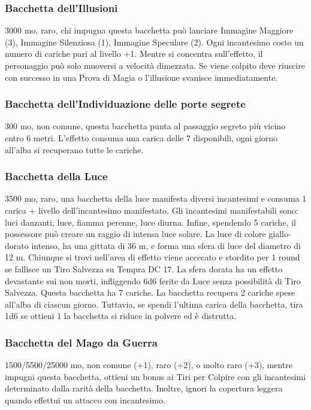 \begin{multicols}{2}
\subsubsection*{Bacchetta dell'Illusioni}
3000 mo, raro, chi impugna questa bacchetta può lanciare Immagine Maggiore (3), Immagine Silenziosa (1), Immagine Speculare (2). Ogni incantesimo costo un numero di cariche pari al livello +1. Mentre si concentra sull’effetto, il personaggio può solo muoversi a velocità dimezzata. Se viene colpito deve riuscire con successo in una Prova di Magia o l’illusione svanisce immediatamente.

\subsubsection*{Bacchetta dell'Individuazione delle porte segrete}
300 mo, non comune, questa bacchetta punta al passaggio segreto più vicino entro 6 metri. L'effetto consuma una carica delle 7 disponibili, ogni giorno all'alba si recuperano tutte le cariche.

\subsubsection*{Bacchetta della Luce}
3500 mo, raro, una bacchetta della luce manifesta diversi incantesimi e consuma 1 carica + livello dell'incantesimo manifestato. Gli incantesimi manifestabili sono: luci danzanti, luce, fiamma perenne, luce diurna. Infine, spendendo 5 cariche, il possessore può creare un raggio di intensa luce solare. La luce di colore giallo-dorato intenso, ha una gittata di 36 m, e forma una sfera di luce del diametro di 12 m. Chiunque si trovi nell'area di effetto viene accecato e stordito per 1 round se fallisce un Tiro Salvezza su Tempra DC 17. La sfera dorata ha un effetto devastante sui non morti, infliggendo 6d6 ferite da Luce senza possibilità di Tiro Salvezza. Questa bacchetta ha 7 cariche. La bacchetta recupera 2 cariche spese all'alba di ciascun giorno. Tuttavia, se spendi l'ultima carica della bacchetta, tira 1d6 se ottieni 1 la bacchetta si riduce in polvere ed è distrutta.

\subsubsection*{Bacchetta del Mago da Guerra}
1500/5500/25000 mo, non comune (+1), raro (+2), o molto raro (+3), mentre impugni questa bacchetta, ottieni un bonus ai Tiri per Colpire con gli incantesimi determinato dalla rarità della bacchetta. Inoltre, ignori la copertura leggera quando effettui un attacco con incantesimo.


\end{multicols}
